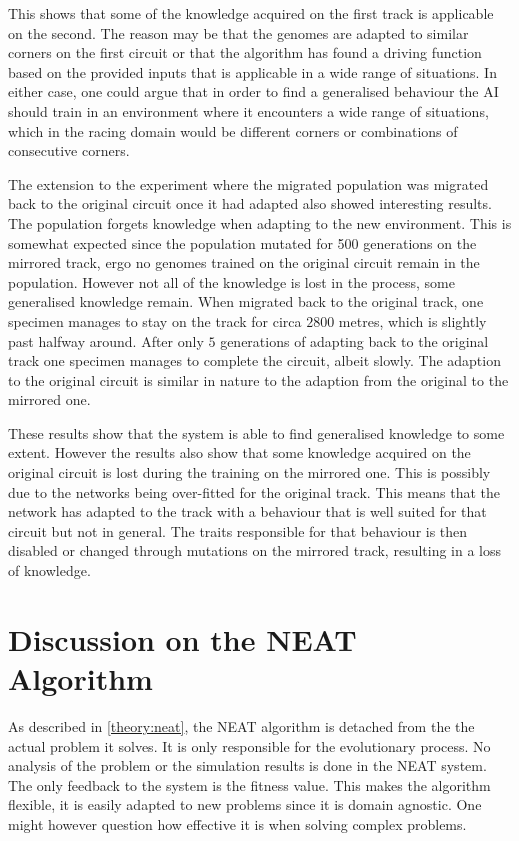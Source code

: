 This shows that some of the knowledge acquired on the first track is applicable on the second. The reason may be that the genomes are adapted to similar corners on the first circuit or that the algorithm has found a driving function based on the provided inputs that is applicable in a wide range of situations. In either case, one could argue that in order to find a generalised behaviour the AI should train in an environment where it encounters a wide range of situations, which in the racing domain would be different corners or combinations of consecutive corners. 

The extension to the experiment where the migrated population was migrated back to the original circuit once it had adapted also showed interesting results. The population forgets knowledge when adapting to the new environment. This is somewhat expected since the population mutated for 500 generations on the mirrored track, ergo no genomes trained on the original circuit remain in the population. However not all of the knowledge is lost in the process, some generalised knowledge remain. When migrated back to the original track, one specimen manages to stay on the track for circa $2800$ metres, which is slightly past halfway around. After only $5$ generations of adapting back to the original track one specimen manages to complete the circuit, albeit slowly. The adaption to the original circuit is similar in nature to the adaption from the original to the mirrored one. 

These results show that the system is able to find generalised knowledge to some extent. However the results also show that some knowledge acquired on the original circuit is lost during the training on the mirrored one. This is possibly due to the networks being over-fitted for the original track. This means that the network has adapted to the track with a behaviour that is well suited for that circuit but not in general. The traits responsible for that behaviour is then disabled or changed through mutations on the mirrored track, resulting in a loss of knowledge.

\section{Discussion on the NEAT Algorithm}
\label{discussion:neat_mechanism}
As described in \ref{theory:neat}, the NEAT algorithm is detached from the the actual problem it solves. It is only responsible for the evolutionary process. No analysis of the problem or the simulation results is done in the NEAT system. The only feedback to the system is the fitness value. This makes the algorithm flexible, it is easily adapted to new problems since it is domain agnostic. One might however question how effective it is when solving complex problems.  


